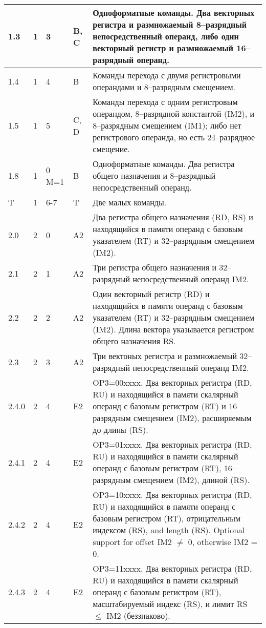 \documentclass[forwardcom.tex]{subfiles}
\begin{document}
\begin{longtable} {|p{15mm}|p{9mm}|p{9mm}|p{13mm}|p{95mm}|}
1.3 & 1 & 3 & B, C & Одноформатные команды. Два векторных регистра и размножаемый 8--разрядный непосредственный операнд, либо один векторный регистр и размножаемый 16--разрядный операнд. \\ \hline
1.4 & 1 & 4 & B & Команды перехода с двумя регистровыми операндами и 8--разрядным смещением.  \\ \hline
1.5 & 1 & 5 & C, D & Команды перехода с одним регистровым операндом, 8--разрядной константой (IM2), и 8--разрядным смещением (IM1); либо нет регистрового операнда, но есть 24--разрядное смещение.  \\ \hline
1.8 & 1 & 0 M=1 & B & Одноформатные команды. Два регистра общего назначения и 8--разрядный непосредственный операнд. \\ \hline
T & 1 & 6-7 & T & Две малых команды. \\ \hline
2.0 & 2 & 0 & A2 & Два регистра общего назначения (RD, RS) и находящийся в памяти операнд с базовым указателем (RT) и 32--разрядным смещением (IM2). \\ \hline
2.1 & 2 & 1 & A2 & Три регистра общего назначения и 32--разрядный непосредственный операнд IM2. \\ \hline
2.2 & 2 & 2 & A2 & Один векторный регистр (RD) и находящийся в памяти операнд с базовым указателем (RT) и 32--разрядным смещением (IM2). Длина вектора указывается регистром общего назначения RS. \\ \hline
2.3 & 2 & 3 & A2 & Три вектоных регистра и размножаемый 32--разрядный непосредственный операнд IM2. \\ \hline
2.4.0 & 2 & 4 & E2 & OP3=00xxxx. Два векторных регистра (RD, RU) и находящийся в памяти скалярный операнд с базовым регистром (RT) и 16--разрядным смещением (IM2), расширяемым до длины (RS). \\ \hline
2.4.1 & 2 & 4 & E2 & OP3=01xxxx. Два векторных регистра (RD, RU) и находящийся в памяти скалярный операнд с базовым регистром (RT), 16--разрядным смещением (IM2), длиной (RS). \\ \hline
2.4.2 & 2 & 4 & E2 & OP3=10xxxx. Два векторных регистра (RD, RU) и находящийся в памяти операнд с базовым регистром (RT), отрицательным индексом (RS), and length (RS). Optional support for offset IM2 $\neq$ 0, otherwise IM2 = 0. \\ \hline
2.4.3 & 2 & 4 & E2 & OP3=11xxxx. Два векторных регистра (RD, RU) и находящийся в памяти скалярный операнд с базовым регистром (RT), масштабируемый индекс (RS), и лимит RS $\leq$ IM2 (беззнаково). \\ \hline

\end{longtable}
\end{document}
